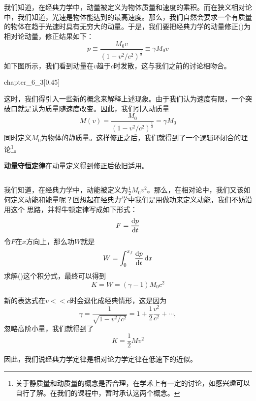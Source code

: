 \section[相对论能动量]{}
\subsection[相对论动量]{}
我们知道，在经典力学中，动量被定义为物体质量和速度的乘积。而在狭义相对论中，我们知道，光速是物体能达到的最高速度。那么，我们自然会要求一个有质量的物体在趋于光速时具有无穷大的动量。于是，我们要把经典力学的动量修正()为相对论动量，修正结果如下：
\[p\equiv\frac{M_0v}{\left(1-v^{2}/c^{2}\right)^{\frac{1}{2}}}\equiv\gamma M_0 v\]
如下图所示，我们看到动量在$v$趋于$c$时发散，这与我们之前的讨论相吻合。
\begin{singlefigure}{chapter_6_3}[0.45]
\end{singlefigure}
这时，我们得引入一些新的概念来解释上述现象。由于我们认为速度有限，一个突破口就是认为质量随速度改变。因此，我们引入动质量
\[M(v)=\frac{M_0}{\left(1-v^{2}/c^{2}\right)^{\frac{1}{2}}}=\gamma M_0\]
同时定义$M_0$为物体的静质量。这样修正之后，我们就得到了一个逻辑环闭合的理论\footnote{关于静质量和动质量的概念是否合理，在学术上有一定的讨论，如感兴趣可以自行了解。在我们的课程中，暂时承认这两个概念。}。

\textbf{动量守恒定律}在动量定义得到修正后依旧适用。
\subsection[相对论能量]{}
我们知道，在经典力学中，动能被定义为$\frac{1}{2}M_0v^2$。那么，在相对论中，我们又该如何定义动能和能量呢？回想起在经典力学中我们是用做功来定义动能，我们不妨沿用这个
思路，并将牛顿定律写成如下形式：
\[F=\frac{\dif p}{\dif t}\]
令$F$在$x$方向上，那么功$W$就是
\[W=\int_0^{x_f} \dfrac{\dif p}{\dif t}\dif x\]
求解()这个积分式，最终可以得到
\begin{equation}
    K=W=(\gamma -1)M_0c^2
\end{equation}

新的表达式在$v<<c$时会退化成经典情形，这是因为
\[\gamma=\frac{1}{\sqrt{1-v^2/c^2}}=1+\frac{1}{2}\frac{v^2}{c^2}+\cdots,\]
忽略高阶小量，我们就得到了
\[K=\frac{1}{2}Mv^2\]

因此，我们说经典力学定律是相对论力学定律在低速下的近似。

